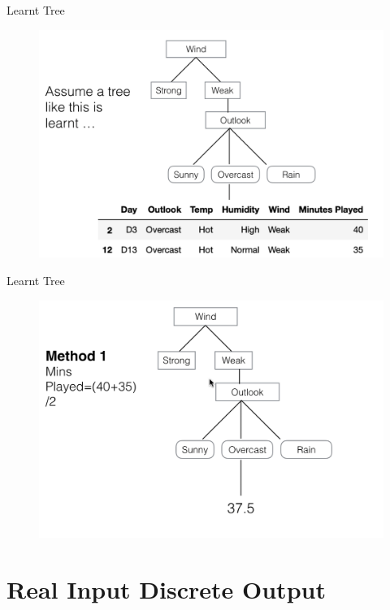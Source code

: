 \documentclass[usenames,dvipsnames]{beamer}
\begin{document}
\begin{frame}{Learnt Tree}
\begin{figure}
	\centering
	\includegraphics[width=1\linewidth]{../diagrams/decision-trees/tree}

	\label{fig:tree}
\end{figure}

\end{frame}

\begin{frame}{Learnt Tree}
\begin{figure}
	\centering
	\includegraphics[width=1\linewidth]{../diagrams/decision-trees/tree2}

	\label{fig:tree}
\end{figure}

\end{frame}

\section{Real Input Discrete Output}
\end{document}
